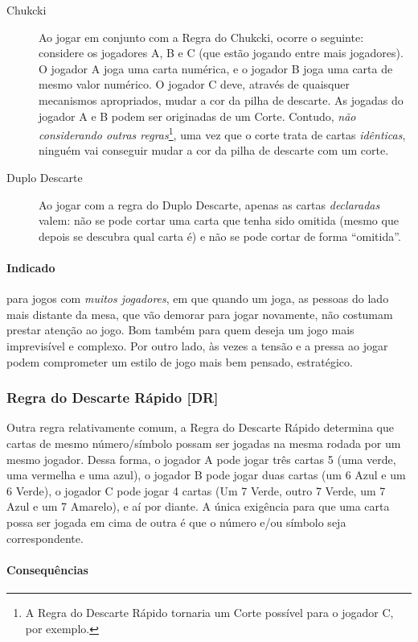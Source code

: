 \begin{description}
\item[Chukcki]{Ao jogar em conjunto com a Regra do Chukcki, ocorre o seguinte: considere os jogadores A, B e C (que estão jogando entre mais jogadores). O jogador A joga uma carta numérica, e o jogador B joga uma carta de mesmo valor numérico. O jogador C deve, através de quaisquer mecanismos apropriados, mudar a cor da pilha de descarte. As jogadas do jogador A e B podem ser originadas de um Corte. Contudo, \emph{não considerando outras regras}\footnote{A Regra do Descarte Rápido tornaria um Corte possível para o jogador C, por exemplo.}, uma vez que o corte trata de cartas \emph{idênticas}, ninguém vai conseguir mudar a cor da pilha de descarte com um corte.}
\item[Duplo Descarte]{Ao jogar com a regra do Duplo Descarte, apenas as cartas \emph{declaradas} valem: não se pode cortar uma carta que tenha sido omitida (mesmo que depois se descubra qual carta é) e não se pode cortar de forma ``omitida''.}
\end{description}

\paragraph{Indicado} 

para jogos com \emph{muitos jogadores}, em que quando um joga, as pessoas do lado mais distante da mesa, que vão demorar para jogar novamente, não costumam prestar atenção ao jogo. Bom também para quem deseja um jogo mais imprevisível e complexo. Por outro lado, às vezes a tensão e a pressa ao jogar podem comprometer um estilo de jogo mais bem pensado, estratégico.

\subsubsection{Regra do Descarte Rápido [DR]}

Outra regra relativamente comum, a Regra do Descarte Rápido determina que cartas de mesmo número/símbolo possam ser jogadas na mesma rodada por um mesmo jogador. Dessa forma, o jogador A pode jogar três cartas 5 (uma verde, uma vermelha e uma azul), o jogador B pode jogar duas cartas (um 6 Azul e um 6 Verde), o jogador C pode jogar 4 cartas (Um 7 Verde, outro 7 Verde, um 7 Azul e um 7 Amarelo), e aí por diante. A única exigência para que uma carta possa ser jogada em cima de outra é que o número e/ou símbolo seja correspondente.

\paragraph{Consequências}

